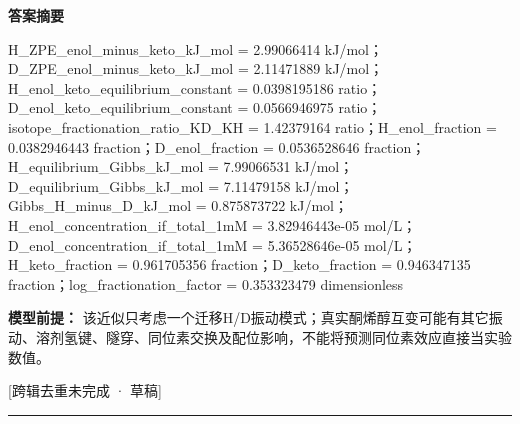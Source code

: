 \documentclass[UTF8,11pt,a4paper]{ctexart}
\begin{document}
\noindent\textbf{答案摘要}\par
H\_ZPE\_enol\_minus\_keto\_kJ\_mol = 2.99066414 kJ/mol；D\_ZPE\_enol\_minus\_keto\_kJ\_mol = 2.11471889 kJ/mol；H\_enol\_keto\_equilibrium\_constant = 0.0398195186 ratio；D\_enol\_keto\_equilibrium\_constant = 0.0566946975 ratio；isotope\_fractionation\_ratio\_KD\_KH = 1.42379164 ratio；H\_enol\_fraction = 0.0382946443 fraction；D\_enol\_fraction = 0.0536528646 fraction；H\_equilibrium\_Gibbs\_kJ\_mol = 7.99066531 kJ/mol；D\_equilibrium\_Gibbs\_kJ\_mol = 7.11479158 kJ/mol；Gibbs\_H\_minus\_D\_kJ\_mol = 0.875873722 kJ/mol；H\_enol\_concentration\_if\_total\_1mM = 3.82946443e-05 mol/L；D\_enol\_concentration\_if\_total\_1mM = 5.36528646e-05 mol/L；H\_keto\_fraction = 0.961705356 fraction；D\_keto\_fraction = 0.946347135 fraction；log\_fractionation\_factor = 0.353323479 dimensionless\par
\noindent\textbf{模型前提：}
该近似只考虑一个迁移H/D振动模式；真实酮烯醇互变可能有其它振动、溶剂氢键、隧穿、同位素交换及配位影响，不能将预测同位素效应直接当实验数值。\par
\noindent\textcolor{red!65!black}{[跨辑去重未完成 · 草稿]} \par
\medskip\hrule\medskip
{}
\end{document}
